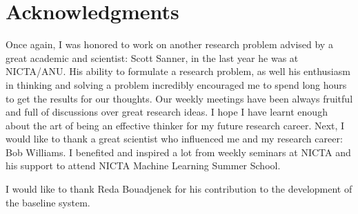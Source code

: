 \chapter*{Acknowledgments}

Once again, I was honored to work on another research problem advised by a great academic and scientist: Scott Sanner, in the last year he was at NICTA/ANU. His ability to formulate a research problem, as well his enthusiasm in thinking and solving a problem incredibly encouraged me to spend long hours to get the results for our thoughts. Our weekly meetings have been always fruitful and full of discussions over great research ideas. I hope I have learnt enough about the art of being an effective thinker for my future research career. Next, I would like to thank a great scientist who influenced me and my research career: Bob Williams. I benefited and inspired a lot from weekly seminars at NICTA and his support to attend NICTA Machine Learning Summer School.  

I would like to thank Reda Bouadjenek for his contribution to the development of the baseline system. 